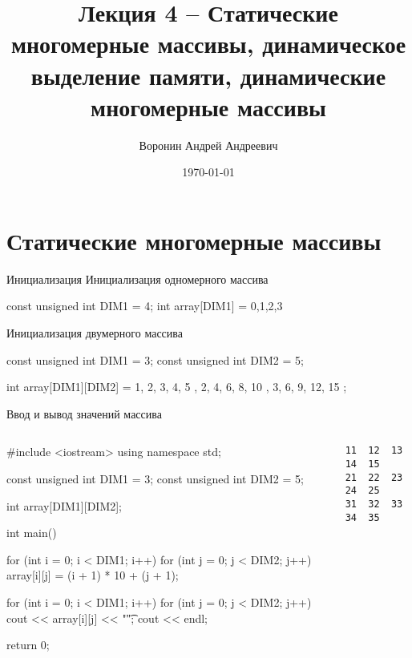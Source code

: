 \documentclass[
    9pt,
    hyperref={pdfencoding=unicode}
    ]{beamer}
\author{Воронин Андрей Андреевич}
\title{Лекция 4 – Статические многомерные массивы, динамическое выделение памяти, динамические многомерные массивы}
\institute{Кафедра прикладной математики и информатики}
\date{\today}
\theoremstyle{definition}
\begin{document}
\titlepage 
\section{Статические многомерные массивы}

\begin{frame}[fragile]{Инициализация}
    Инициализация одномерного массива
    \begin{cppcode}
        const unsigned int DIM1 = 4;
        int array[DIM1] = {0,1,2,3}
    \end{cppcode}
    
    Инициализация двумерного массива
    \begin{cppcode}
        const unsigned int DIM1 = 3;
        const unsigned int DIM2 = 5;
        
        int array[DIM1][DIM2] = {
            { 1, 2, 3, 4, 5 },
            { 2, 4, 6, 8, 10 },
            { 3, 6, 9, 12, 15 }
        };
    \end{cppcode}
    
\end{frame}

\begin{frame}[fragile]{Ввод и вывод значений массива}
    \footnotesize
    \begin{columns}
        \begin{column}{0.7\textwidth}
             \begin{cppcode}
                #include <iostream>        
                using namespace std;   
                
                const unsigned int DIM1 = 3;
                const unsigned int DIM2 = 5;
                
                int array[DIM1][DIM2];
                
                int main() {            
                    for (int i = 0; i < DIM1; i++) {
                        for (int j = 0; j < DIM2; j++) {
                            array[i][j] = (i + 1) * 10 + (j + 1);
                        }
                    }
                    
                    for (int i = 0; i < DIM1; i++) {
                        for (int j = 0; j < DIM2; j++) {
                            cout << array[i][j] << "\t";
                        }
                        cout << endl;
                    }
                    
                    return 0;
                }
            \end{cppcode}
        \end{column}
        \begin{column}{0.3\textwidth}
            \begin{verbatim}
11  12  13  14  15
21  22  23  24  25
31  32  33  34  35
            \end{verbatim}
        \end{column}
    \end{columns}
   
\end{frame}
\end{document}
